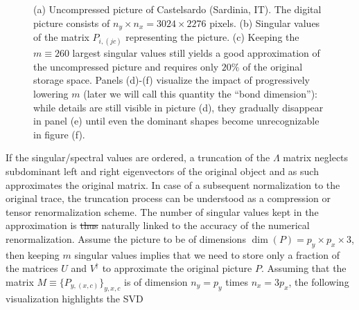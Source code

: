 \documentclass{svmono}
\providecommand{\DIFdeltex}[1]{{\protect\color{red}\sout{#1}}}                      %
\providecommand{\DIFdelbegin}{} %
\providecommand{\DIFdelend}{} %
\providecommand{\DIFdel}[1]{\texorpdfstring{\DIFdeltex{#1}}{}} %
\newcommand{\DIFscaledelfig}{0.5}
\newlength{\DIFdelgraphicswidth} %
\newlength{\DIFdelgraphicsheight} %
\newcommand{\DIFdelincludegraphics}[2][]{%
\sbox{\DIFdelgraphicsbox}{\DIFOincludegraphics[#1]{#2}}%
\settoboxwidth{\DIFdelgraphicswidth}{\DIFdelgraphicsbox} %
\settoboxtotalheight{\DIFdelgraphicsheight}{\DIFdelgraphicsbox} %
\scalebox{\DIFscaledelfig}{%
\parbox[b]{\DIFdelgraphicswidth}{\usebox{\DIFdelgraphicsbox}\\[-\baselineskip] \rule{\DIFdelgraphicswidth}{0em}}\llap{\resizebox{\DIFdelgraphicswidth}{\DIFdelgraphicsheight}{%
\setlength{\unitlength}{\DIFdelgraphicswidth}%
\begin{picture}(1,1)%
\thicklines\linethickness{2pt} %
{\color[rgb]{1,0,0}\put(0,0){\framebox(1,1){}}}%
{\color[rgb]{1,0,0}\put(0,0){\line( 1,1){1}}}%
{\color[rgb]{1,0,0}\put(0,1){\line(1,-1){1}}}%
\end{picture}%
}\hspace*{3pt}}} %
} %
\DeclareRobustCommand{\DIFdelbegin}{\DIFOdelbegin \let\includegraphics\DIFdelincludegraphics} %
\DeclareRobustCommand{\DIFdelend}{\DIFOaddend \let\includegraphics\DIFOincludegraphics} %
\begin{document}
\begin{figure}
    \caption{(a) Uncompressed picture of Castelsardo (Sardinia, IT).
    The digital picture consists of $n_y\times n_x=3024\times2276$ pixels. (b) Singular values of the matrix $P_{i,(jc)}$ representing the picture. (c) Keeping the $m\equiv260$ largest singular values still yields a good approximation of the uncompressed picture and requires only $20\%$ of the original storage space. Panels (d)-(f) visualize the impact of progressively lowering $m$ (later we will call this quantity the ``bond dimension''): while details are still visible in picture (d), they gradually disappear in panel (e) until even the dominant shapes become unrecognizable in figure (f).}
    \label{fig:svd_image_compression}
\end{figure}
If the singular/spectral values are ordered, a truncation of the $\Lambda$ matrix neglects subdominant left and right eigenvectors of the original object and as such approximates the original matrix.
In case of a subsequent normalization to the original trace, the truncation process can be understood as a compression or tensor renormalization scheme.
The number of singular values kept in the approximation is \DIFdelbegin \DIFdel{thus }\DIFdelend naturally linked to the accuracy of the numerical renormalization.
Assume the picture to be of dimensions $\dim(P)=p_y\times p_x\times 3$, then keeping $m$ singular values implies that we need to store only a fraction of the matrices $U$ and $V^\dag$ to approximate the original picture $P$.
Assuming that the matrix $M\equiv \{P_{y,(x,c)}\}_{y,x,c}$ is of dimension $n_y=p_y$ times $n_x=3p_x$, the following visualization highlights the SVD
\end{document}
